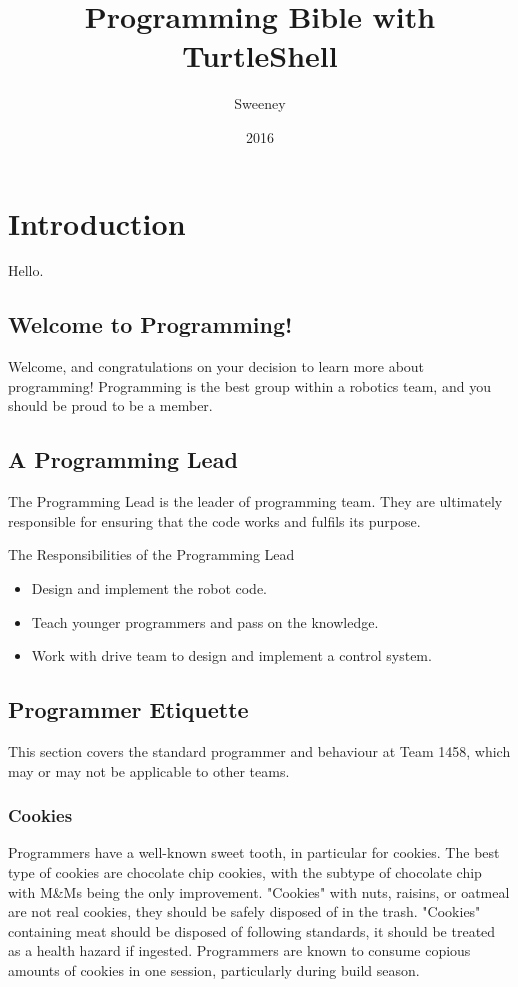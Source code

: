 \documentclass[]{report}
\title{Programming Bible with TurtleShell}
\author{Sweeney}
\date{2016}
\begin{document}
\newcommand{\ITwoC}{I$^{2}$C}
\newcommand{\trademark}{$^{TM}$}
\newcommand{\goodcopyright}{$^{\copyright}$}
\newcommand{\pokemon}{Pok\'emon}
\maketitle

\tableofcontents

\chapter{Introduction}
Hello.

\section{Welcome to Programming!}
Welcome, and congratulations on your decision to learn more about programming!
Programming is the best group within a robotics team, and you should be proud to be a member.

\section{A Programming Lead}
The Programming Lead is the leader of programming team.
They are ultimately responsible for ensuring that the code works and fulfils its purpose.

The Responsibilities of the Programming Lead
\begin{itemize}
\item Design and implement the robot code.
\item Teach younger programmers and pass on the knowledge.
\item Work with drive team to design and implement a control system.
\end{itemize}

\section{Programmer Etiquette}
This section covers the standard programmer and behaviour at Team 1458, which may or may not be applicable to other teams.
\subsection{Cookies}
Programmers have a well-known sweet tooth, in particular for cookies.
The best type of cookies are chocolate chip cookies, with the subtype of chocolate chip with M\&Ms being the only improvement.
"Cookies" with nuts, raisins, or oatmeal are not real cookies, they should be safely disposed of in the trash.
"Cookies" containing meat should be disposed of following standards, it should be treated as a health hazard if ingested.
Programmers are known to consume copious amounts of cookies in one session, particularly during build season.
\end{document}

